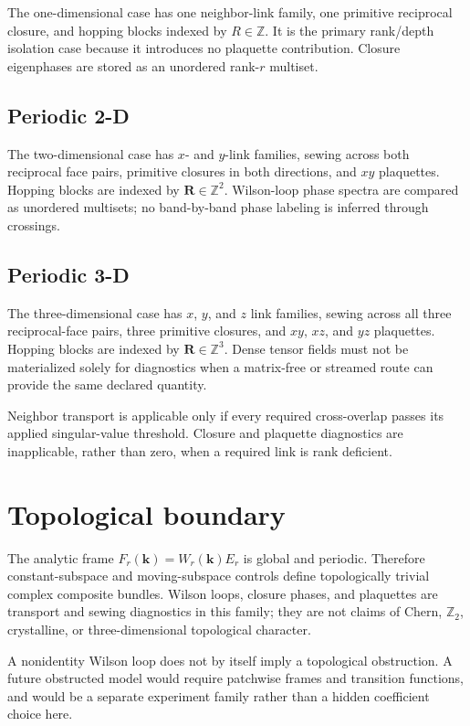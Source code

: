 \documentclass[11pt]{article}
\begin{document}
The one-dimensional case has one neighbor-link family, one primitive reciprocal closure,
and hopping blocks indexed by $R\in\mathbb Z$. It is the primary rank/depth isolation
case because it introduces no plaquette contribution. Closure eigenphases are stored as an
unordered rank-$r$ multiset.

\subsection{Periodic 2-D}

The two-dimensional case has $x$- and $y$-link families, sewing across both reciprocal
face pairs, primitive closures in both directions, and $xy$ plaquettes. Hopping blocks
are indexed by $\mathbf R\in\mathbb Z^2$. Wilson-loop phase spectra are compared as
unordered multisets; no band-by-band phase labeling is inferred through crossings.

\subsection{Periodic 3-D}

The three-dimensional case has $x$, $y$, and $z$ link families, sewing across all three
reciprocal-face pairs, three primitive closures, and $xy$, $xz$, and $yz$ plaquettes.
Hopping blocks are indexed by $\mathbf R\in\mathbb Z^3$. Dense tensor fields must not be
materialized solely for diagnostics when a matrix-free or streamed route can provide the
same declared quantity.

Neighbor transport is applicable only if every required cross-overlap passes its applied
singular-value threshold. Closure and plaquette diagnostics are inapplicable, rather than
zero, when a required link is rank deficient.

\section{Topological boundary}

The analytic frame $F_r(\mathbf k)=W_r(\mathbf k)E_r$ is global and periodic. Therefore
constant-subspace and moving-subspace controls define topologically trivial complex composite bundles. Wilson loops, closure
phases, and plaquettes are transport and sewing diagnostics in this family; they are not
claims of Chern, $\mathbb Z_2$, crystalline, or three-dimensional topological character.

A nonidentity Wilson loop does not by itself imply a topological obstruction. A future
obstructed model would require patchwise frames and transition functions, and would be a
separate experiment family rather than a hidden coefficient choice here.
\end{document}

